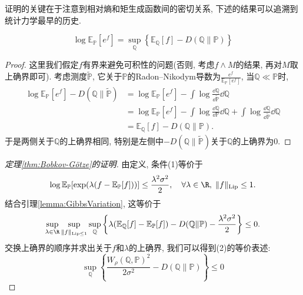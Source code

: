证明的关键在于注意到相对熵和矩生成函数间的密切关系, 下述的结果可以追溯到统计力学最早的历史. 
\begin{lemma}[Gibbs变分原理]\label{lemma:GibbsVariation}
	\begin{equation*}
		\log \mathbb{E}_{\mathbb{P}}[e^f] = \sup_{\mathbb{Q}} \left\{ \mathbb{E}_{\mathbb{Q}} [f] - D(\mathbb{Q} \| \mathbb{P}) \right\}
	\end{equation*}
\end{lemma}
\begin{proof}
	这里我们假定$f$有界来避免可积性的问题(否则, 考虑$f \wedge M$的结果, 再对$M$取上确界即可). 
	考虑测度$\tilde{\mathbb{P}}$, 它关于$\mathbb{P}$的Radon–Nikodym导数为$\frac{e^{f}}{\mathbb{E}_{\mathbb{P}}[e^{f}]}$, 当$\mathbb{Q} \ll \mathbb{P}$时, 
	\begin{align*}
		\log \mathbb{E}_{\mathbb{P}}[e^f] - D(\mathbb{Q} \| \tilde{\mathbb{P}})
		&= \log \mathbb{E}_{\mathbb{P}}[e^f] - \int \log \frac{\dd \mathbb{Q}}{\dd \tilde{\mathbb{P}}} \dd \mathbb{Q} \\
		&= \log \mathbb{E}_{\mathbb{P}}[e^f] - \int \log \frac{\dd \mathbb{Q}}{\dd \mathbb{P}} \dd \mathbb{Q} + \int \log \frac{\dd \mathbb{Q}}{\dd \tilde{\mathbb{P}}} \dd \mathbb{Q} \\
		&= \mathbb{E}_{\mathbb{Q}}[f] - D(\mathbb{Q} \| \mathbb{P}). 
	\end{align*}
	于是两侧关于$\mathbb{Q}$的上确界相同, 特别是左侧中$- D(\mathbb{Q} \| \tilde{\mathbb{P}})$关于$\mathbb{Q}$的上确界为$0$.   
\end{proof}

\begin{proof}[\keben 定理\ref{thm:Bobkov-Götze}的证明]
	由定义, 条件(1)等价于
	\begin{equation*}
		\log \mathbb{E}_{\mathbb{P}} [\exp(\lambda(f - \mathbb{E}_{\mathbb{P}}[f]))] \leq \frac{\lambda^2 \sigma^2}{2}, 
		\quad \forall \lambda \in \R,\; \|f\|_{\text{Lip}} \leq 1. 
	\end{equation*}
	结合引理\ref{lemma:GibbsVariation}, 这等价于
	\begin{equation*}
		\sup_{\lambda \in \R} \sup_{\|f\|_{\text{Lip} \leq 1}} \sup_{\mathbb{Q}} \left\{\lambda(\mathbb{E}_{\mathbb{Q}}[f] - \mathbb{E}_{\mathbb{P}}[f]) - D(\mathbb{Q} \| \mathbb{P}) -  \frac{\lambda^2 \sigma^2}{2} \right\} \leq 0. 
	\end{equation*}
	交换上确界的顺序并求出关于$f$和$\lambda$的上确界, 我们可以得到(2)的等价表述: 
	\begin{equation*}
		\sup_{\mathbb{Q}} \left\{\frac{W_{\rho}(\mathbb{Q}, \mathbb{P})^2}{2 \sigma^2} - D(\mathbb{Q} \| \mathbb{P}) \right\} \leq 0
	\end{equation*}
\end{proof}

